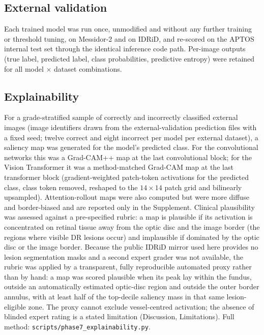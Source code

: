 \documentclass[11pt,a4paper]{article}
\begin{document}
\subsection{External validation}
\label{sec:external}

Each trained model was run once, unmodified and without any further training or
threshold tuning, on Messidor-2 and on IDRiD, and re-scored on the APTOS
internal test set through the identical inference code path. Per-image outputs
(true label, predicted label, class probabilities, predictive entropy) were
retained for all model $\times$ dataset combinations.

\subsection{Explainability}
For a grade-stratified sample of correctly and incorrectly classified external
images (image identifiers drawn from the external-validation prediction files
with a fixed seed; twelve correct and eight incorrect per model per external
dataset), a saliency map was generated for the model's predicted class. For the
convolutional networks this was a Grad-CAM++ map \citep{chattopadhay2018gradcampp}
at the last convolutional block; for the Vision Transformer it was a
method-matched Grad-CAM map at the last transformer block (gradient-weighted
patch-token activations for the predicted class, class token removed, reshaped to
the $14\times14$ patch grid and bilinearly upsampled). Attention-rollout maps
\citep{abnar2020rollout} were also computed but were more diffuse and
border-biased and are reported only in the Supplement. Clinical plausibility was
assessed against a pre-specified rubric: a
map is plausible if its activation is concentrated on retinal tissue away from
the optic disc and the image border (the regions where visible DR lesions occur)
and implausible if dominated by the optic disc or the image border. Because the
public IDRiD mirror used here provides no lesion segmentation masks and a second
expert grader was not available, the rubric was applied by a transparent,
fully reproducible automated proxy rather than by hand: a map was scored
plausible when its peak lay within the fundus, outside an automatically estimated
optic-disc region and outside the outer border annulus, with at least half of the
top-decile saliency mass in that same lesion-eligible zone. The proxy cannot
exclude vessel-centred activation; the absence of blinded expert rating is a
stated limitation (Discussion, Limitations). Full method:
\texttt{scripts/phase7\_explainability.py}.
\end{document}
